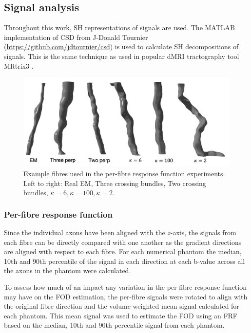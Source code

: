 \subsection{Signal analysis}
\label{sec:frf_signal_analysis}
Throughout this work, \ac{SH} representations of signals are used. The MATLAB implementation of \ac{CSD} \cite{Tournier2007} from J-Donald Tournier (\url{https://github.com/jdtournier/csd}) is used to calculate \ac{SH} decompositions of signals. This is the same technique as used in popular \ac{dMRI} tractography tool MRtrix3 \cite{Tournier2019}.
\begin{figure}
  \centering
 \includegraphics[width=\textwidth]{figures/frf_experiment/fibre_examples_caption}
  \caption{Example fibres used in the per-fibre response function experiments. Left to right: Real EM, Three crossing bundles, Two crossing bundles, $\kappa=6, \kappa=100, \kappa=2$.}
  \label{fig:frf_example_fibres}
\end{figure}
\subsubsection{Per-fibre response function}
\label{sec:frf_sig_proc_per_fibre}
Since the individual axons have been aligned with the $z$-axis, the signals from each fibre can be directly compared with one another as the gradient directions are aligned with respect to each fibre.
For each numerical phantom the median, 10th and 90th percentile of the signal in each direction at each b-value across all the axons in the phantom were calculated.

To assess how much of an impact any variation in the per-fibre response function may have on the \ac{FOD} estimation, the per-fibre signals were rotated to align with the original fibre direction and the volume-weighted mean signal calculated for each phantom. This mean signal was used to estimate the \ac{FOD} using an \ac{FRF} based on the median, 10th and 90th percentile signal from each phantom.

